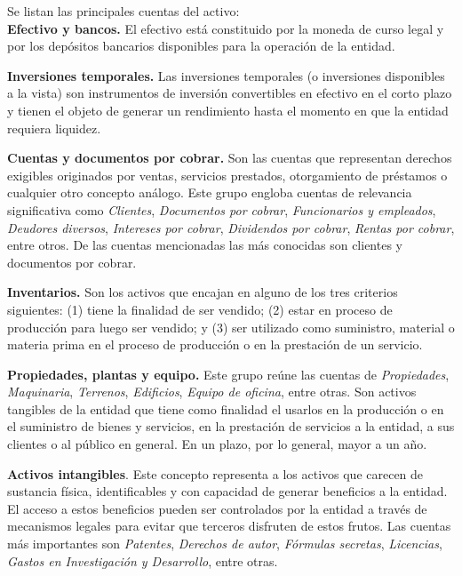 \documentclass[12pt]{article}
\begin{document}
			Se listan las principales cuentas del activo: \\

			\textbf{Efectivo y bancos.} El efectivo está constituido por la moneda de curso legal y por los depósitos bancarios disponibles para la operación de la entidad.
			
			\textbf{Inversiones temporales.} Las inversiones temporales (o inversiones disponibles a la vista) son instrumentos de inversión convertibles en efectivo en el corto plazo y tienen el objeto de generar un rendimiento hasta el momento en que la entidad requiera liquidez.

			\textbf{Cuentas y documentos por cobrar.} Son las cuentas que representan derechos exigibles originados por ventas, servicios prestados, otorgamiento de préstamos o cualquier otro concepto análogo. Este grupo engloba cuentas de relevancia significativa como \emph{Clientes}, \emph{Documentos por cobrar}, \emph{Funcionarios y empleados}, \emph{Deudores diversos}, \emph{Intereses por cobrar}, \emph{Dividendos por cobrar}, \emph{Rentas por cobrar}, entre otros. De las cuentas mencionadas las más conocidas son clientes y documentos por cobrar.

			\textbf{Inventarios.} Son los activos que encajan en alguno de los tres criterios siguientes: (1) tiene la finalidad de ser vendido; (2) estar en proceso de producción para luego ser vendido; y (3) ser utilizado como suministro, material o materia prima en el proceso de producción o en la prestación de un servicio.

			\textbf{Propiedades, plantas y equipo.} Este grupo reúne las cuentas de \emph{Propiedades}, \emph{Maquinaria}, \emph{Terrenos}, \emph{Edificios}, \emph{Equipo de oficina}, entre otras. Son activos tangibles de la entidad que tiene como finalidad el usarlos en la producción o en el suministro de bienes y servicios, en la prestación de servicios a la entidad, a sus clientes o al público en general. En un plazo, por lo general, mayor a un año.

			\textbf{Activos intangibles}. Este concepto representa a los activos que carecen de sustancia física, identificables y con capacidad de generar beneficios a la entidad. El acceso a estos beneficios pueden ser controlados por la entidad a través de mecanismos legales para evitar que terceros disfruten de estos frutos. Las cuentas más importantes son \emph{Patentes}, \emph{Derechos de autor}, \emph{Fórmulas secretas}, \emph{Licencias}, \emph{Gastos en Investigación y Desarrollo}, entre otras. 
\end{document}
